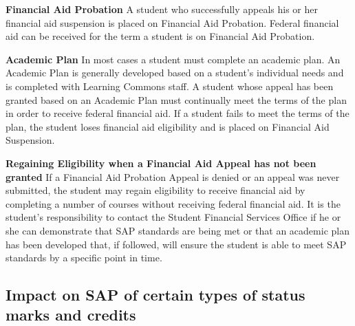 \documentclass[
  letterpaper,
]{scrbook}
\begin{document}
\textbf{Financial Aid Probation} A student who successfully appeals his
or her financial aid suspension is placed on Financial Aid Probation.
Federal financial aid can be received for the term a student is on
Financial Aid Probation.

\textbf{Academic Plan} In most cases a student must complete an academic
plan. An Academic Plan is generally developed based on a student's
individual needs and is completed with Learning Commons staff. A student
whose appeal has been granted based on an Academic Plan must continually
meet the terms of the plan in order to receive federal financial aid. If
a student fails to meet the terms of the plan, the student loses
financial aid eligibility and is placed on Financial Aid Suspension.

\textbf{Regaining Eligibility when a Financial Aid Appeal has not been
granted} If a Financial Aid Probation Appeal is denied or an appeal was
never submitted, the student may regain eligibility to receive financial
aid by completing a number of courses without receiving federal
financial aid. It is the student's responsibility to contact the Student
Financial Services Office if he or she can demonstrate that SAP
standards are being met or that an academic plan has been developed
that, if followed, will ensure the student is able to meet SAP standards
by a specific point in time.

\subsection{Impact on SAP of certain types of status marks and
credits}\label{impact-on-sap-of-certain-types-of-status-marks-and-credits}
\end{document}
